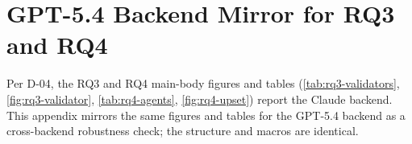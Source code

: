 \section{GPT-5.4 Backend Mirror for RQ3 and RQ4}
\label{sec:appendix:gpt-mirror}

Per D-04, the RQ3 and RQ4 main-body figures and tables (\autoref{tab:rq3-validators}, \autoref{fig:rq3-validator}, \autoref{tab:rq4-agents}, \autoref{fig:rq4-upset}) report the Claude backend. This appendix mirrors the same figures and tables for the GPT-5.4 backend as a cross-backend robustness check; the structure and macros are identical.





